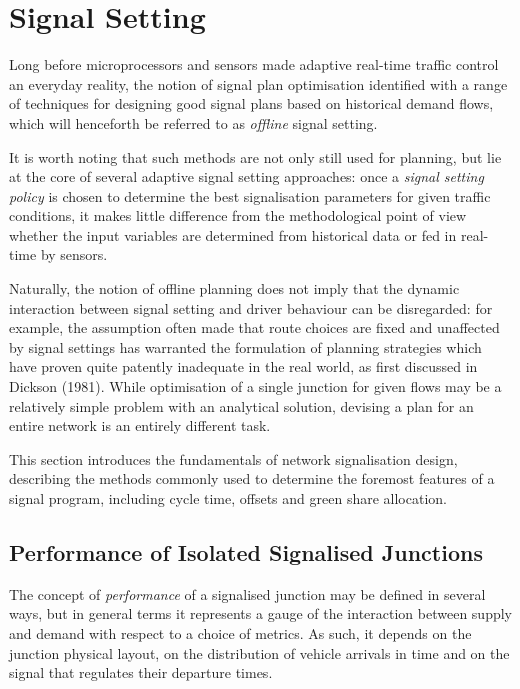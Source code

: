 \section{Signal Setting}
Long before microprocessors and sensors made adaptive real-time traffic control an everyday reality, the notion of signal plan optimisation identified with a range of techniques for designing good signal plans based on historical demand flows, which will henceforth be referred to as \emph{offline} signal setting.

It is worth noting that such methods are not only still used for planning, but lie at the core of several adaptive signal setting approaches: once a \emph{signal setting policy} is chosen to determine the best signalisation parameters for given traffic conditions, it makes little difference from the methodological point of view whether the input variables are determined from historical data or fed in real-time by sensors. 

Naturally, the notion of offline planning does not imply that the dynamic interaction between signal setting and driver behaviour can be disregarded: for example, the assumption often made that route choices are fixed and unaffected by signal settings has warranted the formulation of planning strategies which have proven quite patently inadequate in the real world, as first discussed in Dickson (1981). While optimisation of a single junction for given flows may be a relatively simple problem with an analytical solution, devising a plan for an entire network is an entirely different task.

This section introduces the fundamentals of network signalisation design, describing the methods commonly used to determine the foremost features of a signal program, including cycle time, offsets and green share allocation.

\subsection{Performance of Isolated Signalised Junctions} \label{s:performance}

The concept of \emph{performance} of a signalised junction may be defined in several ways, but in general terms it represents a gauge of the interaction between supply and demand with respect to a choice of metrics. As such, it depends on the junction physical layout, on the distribution of vehicle arrivals in time and on the signal that regulates their departure times. 

